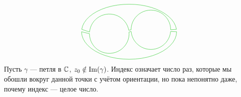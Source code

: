 \documentclass[a4paper]{report}
\begin{document}
{\[\begin{tikzpicture}
        \draw[darkgreen,domain=5:175] plot ({2 + 2.4 * cos(\x)}, {1.6 + 1.4 * sin(\x)});
        \draw[darkgreen,domain=180:360] plot ({2 + 2.4 * cos(\x)}, {1.6 + 1.4 * sin(\x)});
        \draw[darkgreen,domain=10:175] plot ({1 + cos(\x)}, {1.5 + sin(\x)});
        \draw[darkgreen,domain=180:365] plot ({1 + cos(\x)}, {1.5 + sin(\x)});
        \draw[darkgreen,domain=0:180] plot ({3.1 + cos(\x)}, {1.7 + sin(\x)});
        \draw[darkgreen,domain=185:355] plot ({3.1 + cos(\x)}, {1.7 + sin(\x)});
          \draw[darkgreen] ({1 + cos(10)}, {1.5 + sin(10)}) -- ({3.1 + cos(180)}, {1.7 + sin(180)});
          \draw[darkgreen] ({1 + cos(365)}, {1.5 + sin(365)}) -- ({3.1 + cos(185)}, {1.7 + sin(185)});
          \draw[darkgreen] ({1 + cos(175)}, {1.5 + sin(175)}) -- ({2 + 2.4 * cos(175)}, {1.6 + 1.4 * sin(175)});
          \draw[darkgreen] ({1 + cos(180)}, {1.5 + sin(180)}) -- ({2 + 2.4 * cos(180)}, {1.6 + 1.4 * sin(180)});
          \draw[darkgreen] ({3.1 + cos(0)}, {1.7 + sin(0)}) -- ({2 + 2.4 * cos(5)}, {1.6 + 1.4 * sin(175)});
          \draw[darkgreen] ({3.1 + cos(355)}, {1.7 + sin(355)}) -- ({2 + 2.4 * cos(360)}, {1.6 + 1.4 * sin(360)});
    \end{tikzpicture}\]
    }
    Пусть $\gamma$ --- петля в $\mathbb{C}$, $z_0 \notin \operatorname{Im}(\gamma)$.
    Индекс означает число раз, которые мы обошли вокруг данной точки с учётом ориентации, но пока непонятно даже, почему индекс --- целое число.
\end{document}

